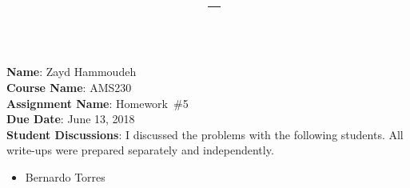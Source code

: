 \documentclass{report}
\title{\textbf{\course\ -- \assnName}}
\author{\name}
\newcommand{\name}{Zayd Hammoudeh}
\newcommand{\course}{AMS230}
\newcommand{\assnName}{Homework~\#5}
\newcommand{\problemFile}[1]{
  \FloatBarrier
  \newpage
  
}
\begin{document}
  \maketitle

  \noindent
  \textbf{Name}: \name \\
  \textbf{Course Name}: \course \\
  \textbf{Assignment Name}: \assnName \\
  \textbf{Due Date}: June 13, 2018 \\
  \textbf{Student Discussions}: I discussed the problems with the following students.  All write-ups were prepared separately and independently. \\
  \vspace{-2.5em}
  \begin{itemize}
    \item Bernardo Torres
  \end{itemize}

  \problemFile{p1}

  \problemFile{p2}
  
  \problemFile{p3}
  
  \problemFile{p4}
  
  \problemFile{p5}
  
\end{document}

